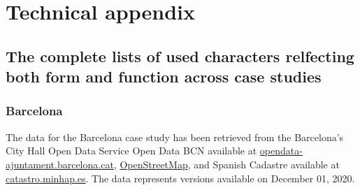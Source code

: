 \appendix
\section{Technical appendix}
\label{sec:appendix}

\subsection{The complete lists of used characters relfecting both form and function across case studies}
\subsubsection{Barcelona}

The data for the Barcelona case study has been retrieved from the Barcelona's City Hall
Open Data Service Open Data BCN available at
\href{https://opendata-ajuntament.barcelona.cat}{opendata-ajuntament.barcelona.cat},
\href{https://osm.org}{OpenStreetMap}, and Spanish Cadastre available at
\href{https://catastro.minhap.es}{catastro.minhap.es}. The data represents versions
available on December 01, 2020.

